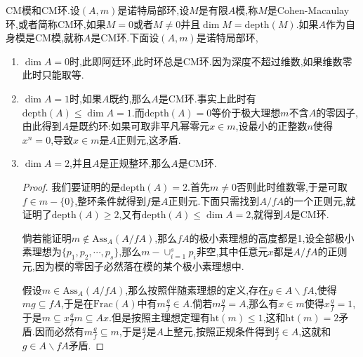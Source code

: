 CM模和CM环.设$(A,m)$是诺特局部环,设$M$是有限$A$模,称$M$是Cohen-Macaulay环,或者简称CM环,如果$M=0$或者$M\not=0$并且$\dim M=\mathrm{depth}(M)$.如果$A$作为自身模是CM模,就称$A$是CM环.下面设$(A,m)$是诺特局部环,
\begin{enumerate}
	\item $\dim A=0$时,此即阿廷环,此时环总是CM环.因为深度不超过维数,如果维数零此时只能取等.
	\item $\dim A=1$时,如果$A$既约,那么$A$是CM环.事实上此时有$\mathrm{depth}(A)\le\dim A=1$.而$\mathrm{depth}(A)=0$等价于极大理想$m$不含$A$的零因子,由此得到$A$是既约环:如果可取非平凡幂零元$x\in m$,设最小的正整数$n$使得$x^n=0$,导致$x\in m$是$A$正则元,这矛盾.
	\item $\dim A=2$,并且$A$是正规整环,那么$A$是CM环.
	\begin{proof}
		
		我们要证明的是$\mathrm{depth}(A)=2$.首先$m\not=0$否则此时维数零,于是可取$f\in m-\{0\}$,整环条件就得到$f$是$A$正则元.下面只需找到$A/fA$的一个正则元,就证明了$\mathrm{depth}(A)\ge2$,又有$\mathrm{depth}(A)\le\dim A=2$,就得到$A$是CM环.
		
		倘若能证明$m\not\in\mathrm{Ass}_A(A/fA)$,那么$fA$的极小素理想的高度都是1,设全部极小素理想为$\{p_1,p_2,\cdots,p_s\}$,那么$m-\cup_{i=1}^sp_i$非空,其中任意元$x$都是$A/fA$的正则元,因为模的零因子必然落在模的某个极小素理想中.
		
		假设$m\in\mathrm{Ass}_A(A/fA)$,那么按照伴随素理想的定义,存在$g\in A\backslash fA$,使得$mg\subseteq fA$,于是在$\mathrm{Frac}(A)$中有$m\frac{g}{f}\in A$.倘若$m\frac{g}{f}=A$,那么有$x\in m$使得$x\frac{g}{f}=1$,于是$m\subseteq x\frac{g}{f}m\subseteq Ax$.但是按照主理想定理有$\mathrm{ht}(m)\le1$,这和$\mathrm{ht}(m)=2$矛盾.因而必然有$m\frac{g}{f}\subseteq m$,于是$\frac{g}{f}$是$A$上整元,按照正规条件得到$\frac{g}{f}\in A$,这就和$g\in A\backslash fA$矛盾.
	\end{proof}
\end{enumerate}

